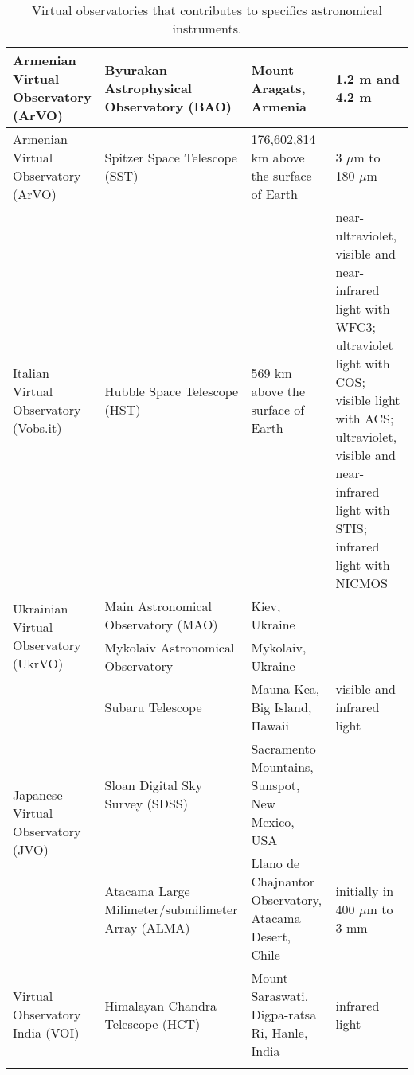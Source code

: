 \begin{center}
\begin{longtable}{|m{3cm}|m{3.5cm}|m{3.5cm}|m{4cm}|}
    \hline
    Armenian Virtual Observatory (ArVO) & Byurakan Astrophysical Observatory
    (BAO) & Mount Aragats, Armenia & 1.2 m and 4.2 m \cite{website:BAO_EMS} \\
    \hline
    Armenian Virtual Observatory (ArVO) & Spitzer Space Telescope (SST) &
    176,602,814 km above the surface of Earth & 3 $ \mu $m to 180 $ \mu $m \\
    \hline
    Italian Virtual Observatory (Vobs.it) & Hubble Space Telescope (HST) & 569
    km above the surface of Earth & near-ultraviolet, visible and near-infrared
    light with WFC3; ultraviolet light with COS; visible light with ACS;
    ultraviolet, visible and near-infrared light with STIS; infrared light with
    NICMOS \\
    \hline
    \multirow{2}{3cm}{Ukrainian Virtual Observatory (UkrVO)} & Main Astronomical
    Observatory (MAO) & Kiev, Ukraine & \\
     \cline{2-4}
     & Mykolaiv Astronomical Observatory & Mykolaiv, Ukraine & \\
    \hline
    \multirow{3}{3cm}{Japanese Virtual Observatory (JVO)} & Subaru Telescope &
    Mauna Kea, Big Island, Hawaii & visible and infrared light
    \cite{website:Subaru_EMS} \\
     \cline{2-4}
     & Sloan Digital Sky Survey (SDSS) & Sacramento Mountains, Sunspot, New
     Mexico, USA & \\
     \cline{2-4} 
     & Atacama Large Milimeter/submilimeter Array (ALMA) & Llano de Chajnantor
     Observatory, Atacama Desert, Chile & initially in 400 $ \mu $m to 3 mm \\
    \hline
    Virtual Observatory India (VOI) & Himalayan Chandra Telescope (HCT) & Mount
    Saraswati, Digpa-ratsa Ri, Hanle, India & infrared light 
    \cite{website:HCT_EMS} \\
    \hline
\caption{Virtual observatories that contributes to specifics astronomical
instruments.}
\label{table:vo_EMS}
\end{longtable}
\end{center}

